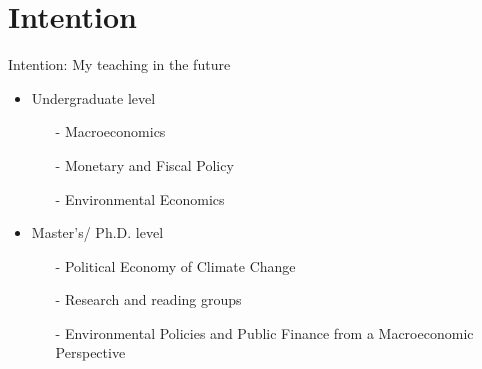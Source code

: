 	\section*{Intention}
	\begin{frame}{Intention: My teaching in the future}
		
		
		\begin{itemize}[<+->]
			\item Undergraduate level
			\begin{itemize}
				\item[-] Macroeconomics
				\item[-] Monetary and Fiscal Policy
				\item[-] Environmental Economics 
			\end{itemize}
			\vspace{2mm}
			\item Master's/ Ph.D. level
			\begin{itemize}
				\item[-] Political Economy of Climate Change
				\item[-] Research and reading groups
				\item[-] \alert{Environmental Policies and Public Finance from a Macroeconomic Perspective}
			\end{itemize}
		\end{itemize}
	\end{frame}
	
